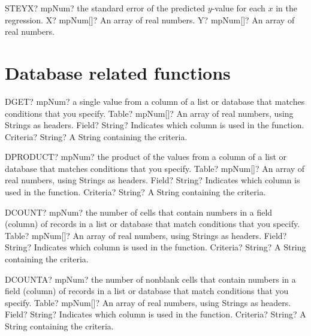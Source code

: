 \documentclass[12pt,a4paper,openany]{book}
\begin{document}
\begin{mpFunctionsExtract}
\mpWorksheetFunctionTwoNotImplemented
{STEYX? mpNum? the standard error of the predicted $y$-value for each $x$ in the regression.}
{X? mpNum[]? An array of real numbers.}
{Y? mpNum[]? An array of real numbers.}
\end{mpFunctionsExtract}

\section{Database related functions}

\begin{mpFunctionsExtract}
\mpWorksheetFunctionThreeNotImplemented
{DGET? mpNum? a single value from a column of a list or database that matches conditions that you specify.}
{Table? mpNum[]? An array of real numbers, using Strings as headers.}
{Field? String? Indicates which column is used in the function.}
{Criteria? String? A String containing the criteria.}
\end{mpFunctionsExtract}

\begin{mpFunctionsExtract}
\mpWorksheetFunctionThreeNotImplemented
{DPRODUCT? mpNum? the product of the values from a column of a list or database that matches conditions that you specify.}
{Table? mpNum[]? An array of real numbers, using Strings as headers.}
{Field? String? Indicates which column is used in the function.}
{Criteria? String? A String containing the criteria.}
\end{mpFunctionsExtract}

\begin{mpFunctionsExtract}
\mpWorksheetFunctionThreeNotImplemented
{DCOUNT? mpNum? the number of cells that contain numbers in a field (column) of records in a list or database that match conditions that you specify.}
{Table? mpNum[]? An array of real numbers, using Strings as headers.}
{Field? String? Indicates which column is used in the function.}
{Criteria? String? A String containing the criteria.}
\end{mpFunctionsExtract}

\begin{mpFunctionsExtract}
\mpWorksheetFunctionThreeNotImplemented
{DCOUNTA? mpNum? the number of nonblank cells that contain numbers in a field (column) of records in a list or database that match conditions that you specify.}
{Table? mpNum[]? An array of real numbers, using Strings as headers.}
{Field? String? Indicates which column is used in the function.}
{Criteria? String? A String containing the criteria.}
\end{mpFunctionsExtract}
\end{document}
